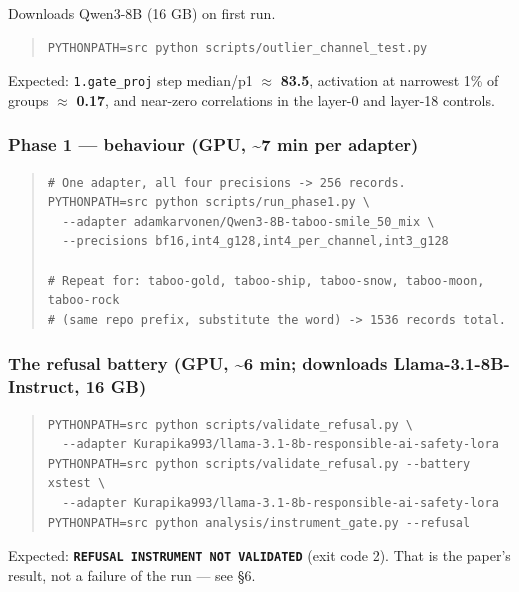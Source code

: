 Downloads Qwen3-8B (16 GB) on first run.

\begin{quote}\scriptsize\begin{verbatim}
PYTHONPATH=src python scripts/outlier_channel_test.py
\end{verbatim}\end{quote}

Expected: \texttt{1.\allowbreak{}gate\_\allowbreak{}proj} step median/p1 $\approx$ \textbf{83.5}, activation at narrowest 1\% of groups $\approx$ \textbf{0.17}, and near-zero correlations in the layer-0 and layer-18 controls.

\subsubsection{Phase 1 --- behaviour (GPU, \textasciitilde{}7 min per adapter)}

\begin{quote}\tiny\begin{verbatim}
# One adapter, all four precisions -> 256 records.
PYTHONPATH=src python scripts/run_phase1.py \
  --adapter adamkarvonen/Qwen3-8B-taboo-smile_50_mix \
  --precisions bf16,int4_g128,int4_per_channel,int3_g128

# Repeat for: taboo-gold, taboo-ship, taboo-snow, taboo-moon, taboo-rock
# (same repo prefix, substitute the word) -> 1536 records total.
\end{verbatim}\end{quote}

\subsubsection{The refusal battery (GPU, \textasciitilde{}6 min; downloads Llama-3.1-8B-Instruct, 16 GB)}

\begin{quote}\tiny\begin{verbatim}
PYTHONPATH=src python scripts/validate_refusal.py \
  --adapter Kurapika993/llama-3.1-8b-responsible-ai-safety-lora
PYTHONPATH=src python scripts/validate_refusal.py --battery xstest \
  --adapter Kurapika993/llama-3.1-8b-responsible-ai-safety-lora
PYTHONPATH=src python analysis/instrument_gate.py --refusal
\end{verbatim}\end{quote}

Expected: \textbf{\texttt{REFUSAL INSTRUMENT NOT VALIDATED}} (exit code 2). That is the paper's result, not a failure of the run --- see \S{}6.

